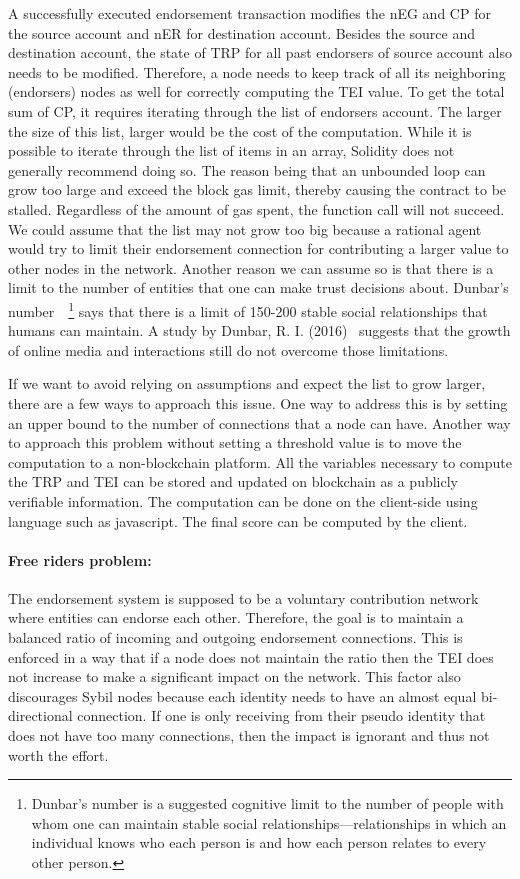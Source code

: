 A successfully executed endorsement transaction modifies the \ac{nEG} and
\ac{CP} for the source account and \ac{nER} for destination account. Besides
the source and destination account, the state of \ac{TRP} for all past
endorsers of source account also needs to be modified. Therefore, a node needs
to keep track of all its neighboring (endorsers) nodes as well for correctly
computing the \ac{TEI} value. To get the total sum of \ac{CP}, it requires
iterating through the list of endorsers account. The larger the size of this
list, larger would be the cost of the computation. While it is possible to
iterate through the list of items in an array, Solidity does not generally
recommend doing so. The reason being that an unbounded loop can grow too large
and exceed the block gas limit, thereby causing the contract to be stalled.
Regardless of the amount of gas spent, the function call will not succeed. We
could assume that the list may not grow too big because a rational agent would
try to limit their endorsement connection for contributing a larger value to
other nodes in the network. Another reason we can assume so is that there is a
limit to the number of entities that one can make trust decisions about.
Dunbar's number~\cite{hill2003social}~\footnote{Dunbar's number is a suggested
cognitive limit to the number of people with whom one can maintain stable
social relationships—relationships in which an individual knows who each person
is and how each person relates to every other person.} says that there is a
limit of 150-200 stable social relationships that humans can maintain. A study
by Dunbar, R. I. (2016)~\cite{dunbar2016online} suggests that the growth of
online media and interactions still do not overcome those limitations. \par 
If we want to avoid relying on assumptions and expect the list to grow larger,
there are a few ways to approach this issue. One way to address this is by
setting an upper bound to the number of connections that a node can have.
Another way to approach this problem without setting a threshold value is to
move the computation to a non-blockchain platform. All the variables necessary
to compute the \ac{TRP} and \ac{TEI} can be stored and updated on blockchain as
a publicly verifiable information. The computation can be done on the
client-side using language such as javascript. The final score can be computed
by the client.  
\paragraph{Free riders problem:} The endorsement system is supposed to be a
voluntary contribution network where entities can endorse each other.
Therefore, the goal is to maintain a balanced ratio of incoming and outgoing
endorsement connections. This is enforced in a way that if a node does not
maintain the ratio then the \ac{TEI} does not increase to make a significant
impact on the network. This factor also discourages Sybil nodes because each
identity needs to have an almost equal bi-directional connection. If one is
only receiving from their pseudo identity that does not have too many
connections, then the impact is ignorant and thus not worth the effort.

